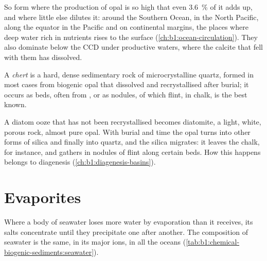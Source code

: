 So  form where the production of opal is so high that even
\qty{3.6}{\%} of it adds up, and where little else dilutes it: around the
Southern Ocean, in the North Pacific, along the equator in the Pacific and on
continental margins, the places where deep water rich in nutrients rises to
the surface (\cref{ch:b1:ocean-circulation}). They also dominate below the CCD
under productive waters, where the calcite that fell with them has dissolved.

\begin{definition}[Chert]\label{def:b1:chemical-biogenic-sediments:chert}
A \emph{chert} is a hard, dense sedimentary rock of
microcrystalline quartz, formed in most cases from biogenic opal that dissolved
and recrystallised after burial; it occurs as beds, often from ,
or as nodules, of which flint, in chalk, is the best known.
\end{definition}

A diatom ooze that has not been recrystallised becomes diatomite, a light,
white, porous rock, almost pure opal. With burial and time the opal turns into
other forms of silica and finally into quartz, and the silica migrates: it
leaves the chalk, for instance, and gathers in nodules of flint along certain
beds. How this happens belongs to diagenesis (\cref{ch:b1:diagenesis-basins}).

\section{Evaporites}\label{sec:b1:chemical-biogenic-sediments:evaporites}

Where a body of seawater loses more water by evaporation than it receives, its
salts concentrate until they precipitate one after another. The composition of
seawater is the same, in its major ions, in all the oceans
(\cref{tab:b1:chemical-biogenic-sediments:seawater}).

